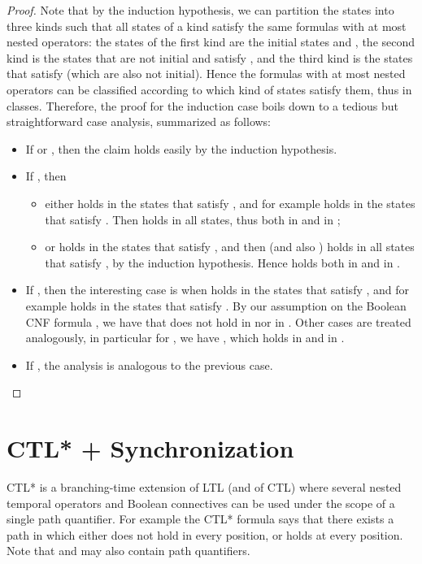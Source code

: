 \documentclass{article}
\begin{document}
\begin{proof}
Note that by the induction hypothesis, we can partition the states into three kinds 
such that all states of a kind satisfy the same formulas with at most  nested operators:
the states of the first kind are the initial states  and ,
the second kind is the states that are not initial and satisfy ,
and the third kind is the states that satisfy  (which are also not initial).
Hence the formulas with at most  nested operators can be classified
according to which kind of states satisfy them, thus in  classes.
Therefore, the proof for the induction case boils down to a tedious but straightforward
case analysis, summarized as follows: 



\begin{itemize}
\item If  or ,
then the claim holds easily by the induction hypothesis.

\item If , then 

\begin{itemize}
\item either  holds in the states that satisfy , and for example 
 holds in the states that satisfy . Then 
holds in all states, thus both in  and in ;

\item or  holds in the states that satisfy , and then 
(and also ) holds in all states that satisfy , by the induction
hypothesis. Hence  holds both in  and in .
\end{itemize}

\item If , then the interesting case 
is when  holds in the states that satisfy , and for example 
 holds in the states that satisfy . By our assumption
on the Boolean CNF formula , we have that  does not hold in 
 nor in . Other cases are treated analogously, in particular
for , we have , 
which holds in  and in .

\item If , the analysis is analogous to the previous case.

\end{itemize}

\end{proof}






\section{CTL* + Synchronization}\label{sec:CTL*}
CTL* is a branching-time extension of LTL (and of CTL) where several nested temporal 
operators and Boolean connectives can be used under the scope of a single
path quantifier. For example the CTL* formula  says that 
there exists a path in which either  does not hold in every position,
or  holds at every position. Note that  and  may also
contain path quantifiers.
\end{document}
